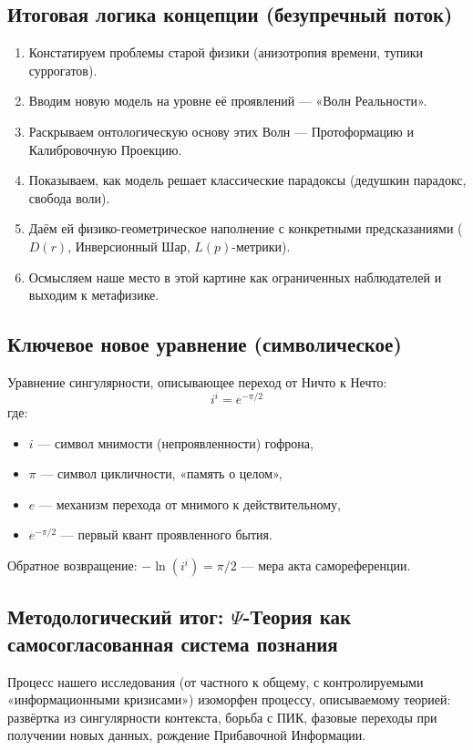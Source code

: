 \documentclass[a4paper,12pt]{article}
\begin{document}
\subsection{Итоговая логика концепции (безупречный поток)}

\begin{enumerate}
	\item Констатируем проблемы старой физики (анизотропия времени, тупики суррогатов).
	\item Вводим новую модель на уровне её проявлений — «Волн Реальности».
	\item Раскрываем онтологическую основу этих Волн — Протоформацию и Калибровочную Проекцию.
	\item Показываем, как модель решает классические парадоксы (дедушкин парадокс, свобода воли).
	\item Даём ей физико-геометрическое наполнение с конкретными предсказаниями ($D(r)$, Инверсионный Шар, $L(p)$-метрики).
	\item Осмысляем наше место в этой картине как ограниченных наблюдателей и выходим к метафизике.
\end{enumerate}

\subsection{Ключевое новое уравнение (символическое)}

Уравнение сингулярности, описывающее переход от Ничто к Нечто:
\[
i^i = e^{-\pi/2}
\]
где:
\begin{itemize}
	\item $i$ — символ мнимости (непроявленности) гофрона,
	\item $\pi$ — символ цикличности, «память о целом»,
	\item $e$ — механизм перехода от мнимого к действительному,
	\item $e^{-\pi/2}$ — первый квант проявленного бытия.
\end{itemize}

Обратное возвращение: $-\ln(i^i) = \pi/2$ — мера акта самореференции.

\subsection{Методологический итог: $\Psi$-Теория как самосогласованная система познания}

Процесс нашего исследования (от частного к общему, с контролируемыми «информационными кризисами») изоморфен процессу, описываемому теорией: развёртка из сингулярности контекста, борьба с ПИК, фазовые переходы при получении новых данных, рождение Прибавочной Информации.
\end{document}
